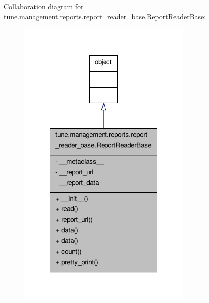 Collaboration diagram for tune.\-management.\-reports.\-report\-\_\-reader\-\_\-base.\-Report\-Reader\-Base\-:
\nopagebreak
\begin{figure}[H]
\begin{center}
\leavevmode
\includegraphics[width=240pt]{classtune_1_1management_1_1reports_1_1report__reader__base_1_1ReportReaderBase__coll__graph}
\end{center}
\end{figure}
